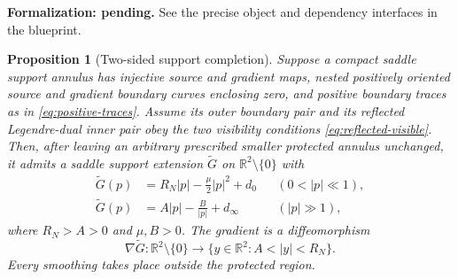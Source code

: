 \documentclass[11pt]{amsart}
\newtheorem{proposition}[theorem]{Proposition}
\theoremstyle{definition}
\theoremstyle{remark}
\numberwithin{equation}{section}
\begin{document}
\par\noindent\textbf{Formalization: pending.} See the precise object and dependency interfaces in the blueprint.\par
\begin{proposition}[Two-sided support completion]\label{prop:dual-radial-completion}
Suppose a compact saddle support annulus has injective source and
gradient maps, nested positively oriented source and gradient boundary
curves enclosing zero, and positive boundary traces as in
\eqref{eq:positive-traces}. Assume its outer boundary pair and its
reflected Legendre-dual inner pair obey the two visibility conditions
\eqref{eq:reflected-visible}. Then, after leaving an arbitrary
prescribed smaller protected annulus unchanged, it admits a saddle
support extension $\widetilde G$ on $\mathbb R^2\setminus\{0\}$ with
\begin{equation}\label{eq:radial-two-ends}
 \begin{aligned}
 \widetilde G(p)&=R_N|p|-\frac\mu2|p|^2+d_0
     && (0<|p|\ll1),\\
 \widetilde G(p)&=A|p|-\frac B{|p|}+d_\infty
     && (|p|\gg1),
 \end{aligned}
\end{equation}
where $R_N>A>0$ and $\mu,B>0$. The gradient is a
diffeomorphism
\begin{equation}\label{eq:full-gradient-annulus}
 \nabla\widetilde G:\mathbb R^2\setminus\{0\}
       \longrightarrow \{y\in\mathbb R^2:A<|y|<R_N\}.
\end{equation}
Every smoothing takes place outside the protected region.
\end{proposition}
\end{document}
